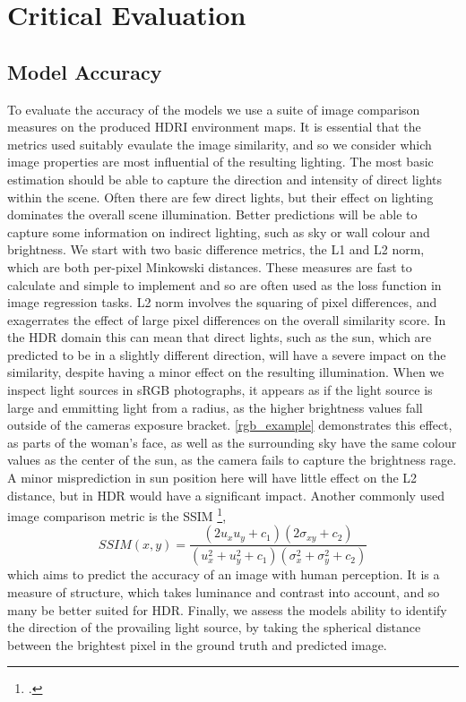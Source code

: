 \documentclass[ %
                    author={Gavin Parker},
                supervisor={Dr. Neill Campbell},
                    degree={MEng},
                     title={Deep Siamese Networks for Illumination Estimation from Stereo Images},
                  subtitle={},
                      type={research},
                      year={2018} ]{dissertation}
\begin{document}
\chapter{Critical Evaluation}
\label{chap:evaluation}

\section{Model Accuracy}
To evaluate the accuracy of the models we use a suite of image comparison measures on the produced HDRI environment maps. It is essential that the metrics used suitably evaulate the image similarity, and so we consider which image properties are most influential of the resulting lighting. The most basic estimation should be able to capture the direction and intensity of direct lights within the scene. Often there are few direct lights, but their effect on lighting dominates the overall scene illumination. Better predictions will be able to capture some information on indirect lighting, such as sky or wall colour and brightness.
\newline 
We start with two basic difference metrics, the L1 and L2 norm, which are both per-pixel Minkowski distances. These measures are fast to calculate and simple to implement and so are often used as the loss function in image regression tasks. L2 norm involves the squaring of pixel differences, and exagerrates the effect of large pixel differences on the overall similarity score. In the HDR domain this can mean that direct lights, such as the sun, which are predicted to be in a slightly different direction, will have a severe impact on the similarity, despite having a minor effect on the resulting illumination. When we inspect light sources in sRGB photographs, it appears as if the light source is large and emmitting light from a radius, as the higher brightness values fall outside of the cameras exposure bracket. \ref{rgb_example} demonstrates this effect, as parts of the woman's face, as well as the surrounding sky have the same colour values as the center of the sun, as the camera fails to capture the brightness rage. A minor misprediction in sun position here will have little effect on the L2 distance, but in HDR would have a significant impact.
\newline
Another commonly used image comparison metric is the SSIM \footcite{http://ieeexplore.ieee.org/stamp/stamp.jsp?tp=&arnumber=1284395},
\[SSIM(x,y) = \frac{(2u_xu_y + c_1)(2\sigma_{xy} + c_2)}{(u^2_x + u^2_y + c_1)(\sigma^2_x + \sigma^2_y + c_2)}\]
which aims to predict the accuracy of an image with human perception. It is a measure of structure, which takes luminance and contrast into account, and so many be better suited for HDR. Finally, we assess the models ability to identify the direction of the provailing light source, by taking the spherical distance between the brightest pixel in the ground truth and predicted image.
\end{document}
